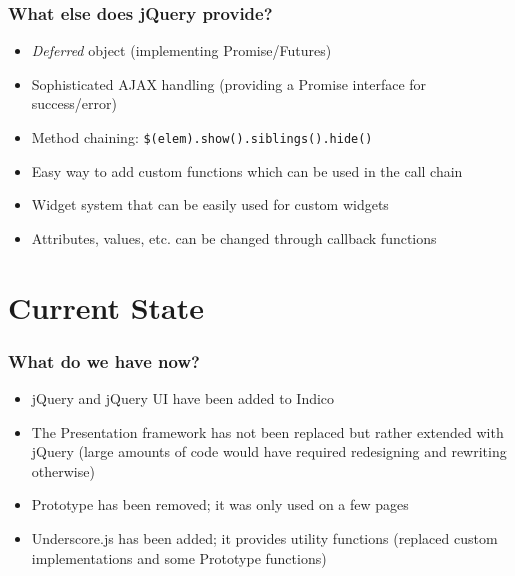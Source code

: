 \documentclass{beamer}
\begin{document}
\begin{frame}
  \frametitle{What else does jQuery provide?}
  \begin{itemize}
    \item \emph{Deferred} object (implementing Promise/Futures)
    \item Sophisticated AJAX handling (providing a Promise interface for success/error)
    \item Method chaining: \lstinline{$(elem).show().siblings().hide()}
    \item Easy way to add custom functions which can be used in the call chain
    \item Widget system that can be easily used for custom widgets
    \item Attributes, values, etc. can be changed through callback functions
  \end{itemize}

  \begin{center}
  \end{center}
\end{frame}

\section{Current State}
\begin{frame}
  \frametitle{What do we have now?}
  \begin{itemize}
    \item jQuery and jQuery UI have been added to Indico
    \item The Presentation framework has not been replaced but rather extended with jQuery (large
      amounts of code would have required redesigning and rewriting otherwise)
    \item Prototype has been removed; it was only used on a few pages
    \item Underscore.js has been added; it provides utility functions (replaced custom
      implementations and some Prototype functions)
  \end{itemize}
\end{frame}
\end{document}
